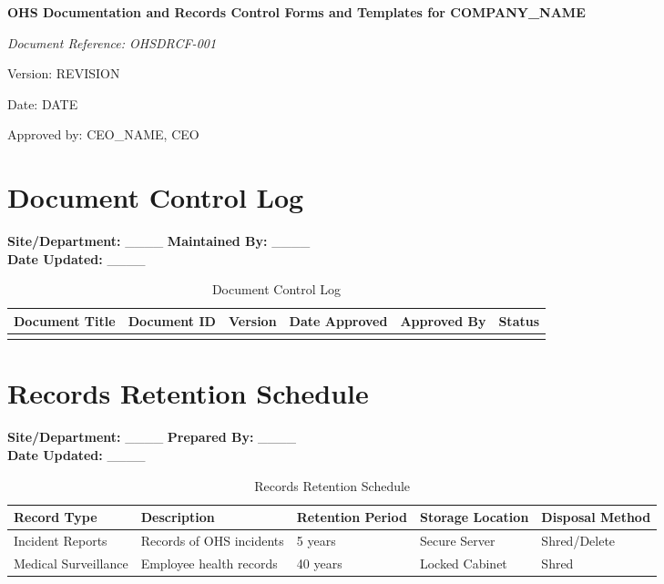 \documentclass[12pt]{article}
\begin{document}
\begin{titlepage}
    \centering
    \vspace*{2cm}
    {\LARGE\bfseries OHS Documentation and Records Control Forms and Templates for {{COMPANY_NAME}}\par}
    \vspace{1cm}
    {\large\itshape Document Reference: OHSDRCF-001\par}
    \vspace{0.5cm}
    {\normalsize Version: {{REVISION}}\par}
    \vspace{0.5cm}
    {\normalsize Date: {{DATE}}\par}
    \vspace{2cm}
    {\normalsize Approved by: {{CEO_NAME}}, CEO\par}
\end{titlepage}

\section{Document Control Log}

\textbf{Site/Department:} \_\_\_\_ \textbf{Maintained By:} \_\_\_\_\\
\textbf{Date Updated:} \_\_\_\_

\begin{table}[h]
    \centering
    \begin{tabular}{p{2cm}p{3cm}p{2cm}p{2cm}p{2cm}p{2cm}}
        \toprule
        \textbf{Document Title} & \textbf{Document ID} & \textbf{Version} & \textbf{Date Approved} & \textbf{Approved By} & \textbf{Status} \\
        \midrule
        & & & & & \\
        \bottomrule
    \end{tabular}
    \caption{Document Control Log}
\end{table}

\section{Records Retention Schedule}

\textbf{Site/Department:} \_\_\_\_ \textbf{Prepared By:} \_\_\_\_\\
\textbf{Date Updated:} \_\_\_\_

\begin{table}[h]
    \centering
    \begin{tabular}{p{3cm}p{3cm}p{2cm}p{2cm}p{3cm}}
        \toprule
        \textbf{Record Type} & \textbf{Description} & \textbf{Retention Period} & \textbf{Storage Location} & \textbf{Disposal Method} \\
        \midrule
        Incident Reports & Records of OHS incidents & 5 years & Secure Server & Shred/Delete \\
        Medical Surveillance & Employee health records & 40 years & Locked Cabinet & Shred \\
        \bottomrule
    \end{tabular}
    \caption{Records Retention Schedule}
\end{table}
\end{document}
